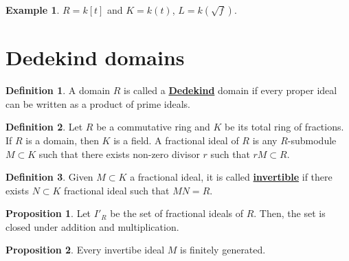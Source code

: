 \documentclass{article}
\theoremstyle{definition}
\theoremstyle{definition}
\theoremstyle{definition}
\newtheorem{proposition}{Proposition}[section]
\theoremstyle{definition}
\theoremstyle{definition}
\newtheorem{definition}{Definition}[section]
\theoremstyle{definition}
\theoremstyle{definition}
\newtheorem{example}{Example}[section]
\begin{document}
\begin{tcolorbox}[colback=yellow!5!white,colframe=yellow!30!white]
\begin{example}
$R=k[t]$ and $K=k(t)$, $L=k(\sqrt{f})$.
\end{example}
\end{tcolorbox}

\section{Dedekind domains}


\begin{tcolorbox}[colback=purple!5!white,colframe=purple!75!black]
\begin{definition}
A domain $R$ is called a \underline{\textbf{Dedekind}} domain if every proper ideal can be written as a product of prime ideals.
\end{definition}
\end{tcolorbox}


\begin{tcolorbox}[colback=purple!5!white,colframe=purple!75!black]
\begin{definition}
Let $R$ be a commutative ring and $K$ be its total ring of fractions. If $R$ is a domain, then $K$ is a field. A fractional ideal of $R$ is any $R$-submodule $M\subset K$ such that there exists non-zero divisor $r$ such that $rM\subset R$. 
\end{definition}
\end{tcolorbox}


\begin{tcolorbox}[colback=purple!5!white,colframe=purple!75!black]
\begin{definition}
Given $M\subset K$ a fractional ideal, it is called \underline{\textbf{invertible}} if there exists $N\subset K$ fractional ideal such that $MN=R$.
\end{definition}
\end{tcolorbox}


\begin{tcolorbox}[colback=blue!5!white,colframe=blue!30!white]
\begin{proposition}
Let $I'_R$ be the set of fractional ideals of $R$. Then, the set is closed under addition and multiplication. 
\end{proposition}
\end{tcolorbox}


\begin{tcolorbox}[colback=blue!5!white,colframe=blue!30!white]
\begin{proposition}
Every invertibe ideal $M$ is finitely generated. 
\end{proposition}
\end{tcolorbox}
\end{document}
